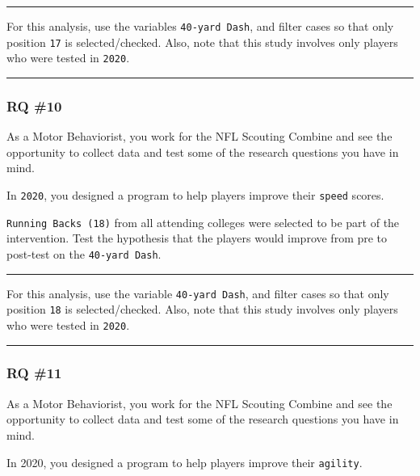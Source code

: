 \documentclass[
]{article}
\begin{document}
\begin{center}\rule{0.5\linewidth}{0.5pt}\end{center}

For this analysis, use the variables \texttt{40-yard\ Dash}, and filter cases so that only position \texttt{17} is selected/checked. Also, note that this study involves only players who were tested in \texttt{2020}.

\begin{center}\rule{0.5\linewidth}{0.5pt}\end{center}

\hypertarget{rq-10}{%
\subsubsection{RQ \#10}\label{rq-10}}

As a Motor Behaviorist, you work for the NFL Scouting Combine and see the opportunity to collect data and test some of the research questions you have in mind.

In \texttt{2020}, you designed a program to help players improve their \texttt{speed} scores.

\texttt{Running\ Backs\ (18)} from all attending colleges were selected to be part of the intervention. Test the hypothesis that the players would improve from pre to post-test on the \texttt{40-yard\ Dash}.

\begin{center}\rule{0.5\linewidth}{0.5pt}\end{center}

For this analysis, use the variable \texttt{40-yard\ Dash}, and filter cases so that only position \texttt{18} is selected/checked. Also, note that this study involves only players who were tested in \texttt{2020}.

\begin{center}\rule{0.5\linewidth}{0.5pt}\end{center}

\hypertarget{rq-11}{%
\subsubsection{RQ \#11}\label{rq-11}}

As a Motor Behaviorist, you work for the NFL Scouting Combine and see the opportunity to collect data and test some of the research questions you have in mind.

In 2020, you designed a program to help players improve their \texttt{agility}.
\end{document}
